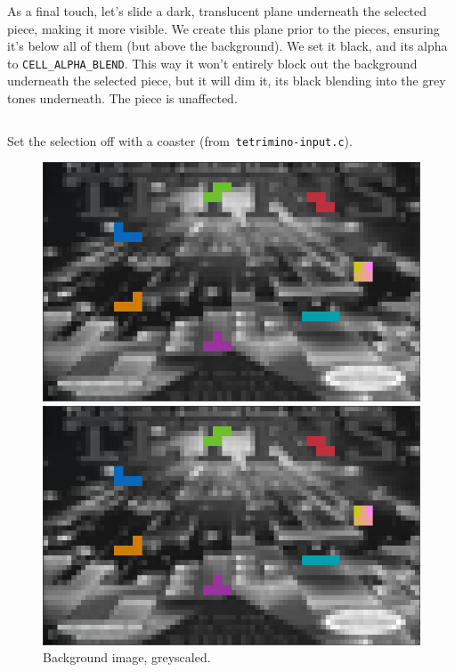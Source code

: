 As a final touch, let's slide a dark, translucent plane underneath the
selected piece, making it more visible. We create this plane prior to the
pieces, ensuring it's below all of them (but above the background). We set it
black, and its alpha to \texttt{CELL\_ALPHA\_BLEND}. This way it won't entirely
block out the background underneath the selected piece, but it will dim it,
its black blending into the grey tones underneath. The piece is unaffected.

\begin{listing}[!htbp]
\inputminted[]{C}{code/tetrimino-box.h}
\caption{Set the selection off with a coaster (from~\texttt{tetrimino-input.c}).}
\label{list:tetrimino-box}
\end{listing}

\begin{figure}[!htbp]
  \centering
  \begin{minipage}{0.30\textwidth}
    \includegraphics[width=1\linewidth]{media/tetrimino-bg.png}
    \caption{Background image, greyscaled.}
    \label{fig:tetrimino-bg}
  \end{minipage}\hfill
  \begin{minipage}{0.30\textwidth}
    \includegraphics[width=1\linewidth]{media/tetrimino-bg.png}

\end{minipage}
\end{figure}
